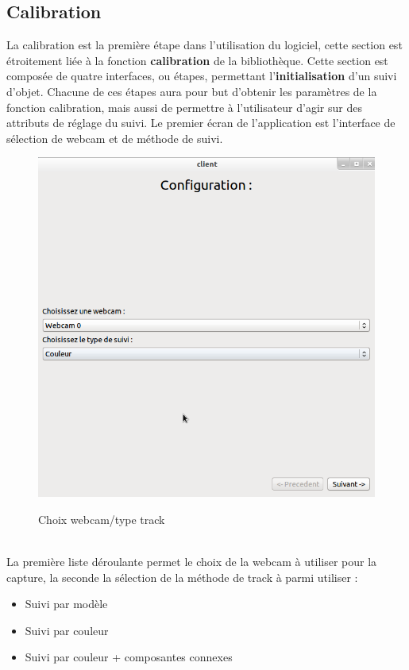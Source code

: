 \documentclass{report}
\begin{document}
			\subsection{Calibration}
				La calibration est la première étape dans l'utilisation du logiciel, cette section est étroitement liée à la fonction \textbf{calibration} de la bibliothèque. Cette section est composée de quatre interfaces, ou étapes, permettant l'\textbf{initialisation} d'un suivi d'objet. Chacune de ces étapes aura pour but d'obtenir les paramètres de la fonction calibration, mais aussi de permettre à l'utilisateur d'agir sur des attributs de réglage du suivi.
				\newpage
				Le premier écran de l'application est l'interface de sélection de webcam et de méthode de suivi.\\
				\begin{figure}[!h]
						\centering
						\includegraphics[scale=0.4]{../images/Capture6.png}\\
						\caption{Choix webcam/type track}
						\label{Choix webcam/type track}
				\end{figure}\\
				La première liste déroulante permet le choix de la webcam à utiliser pour la capture, la seconde la sélection de la méthode de track à parmi utiliser :
				\begin{itemize}
					\item Suivi par modèle
					\item Suivi par couleur
					\item Suivi par couleur + composantes connexes
				\end{itemize}
\end{document}
